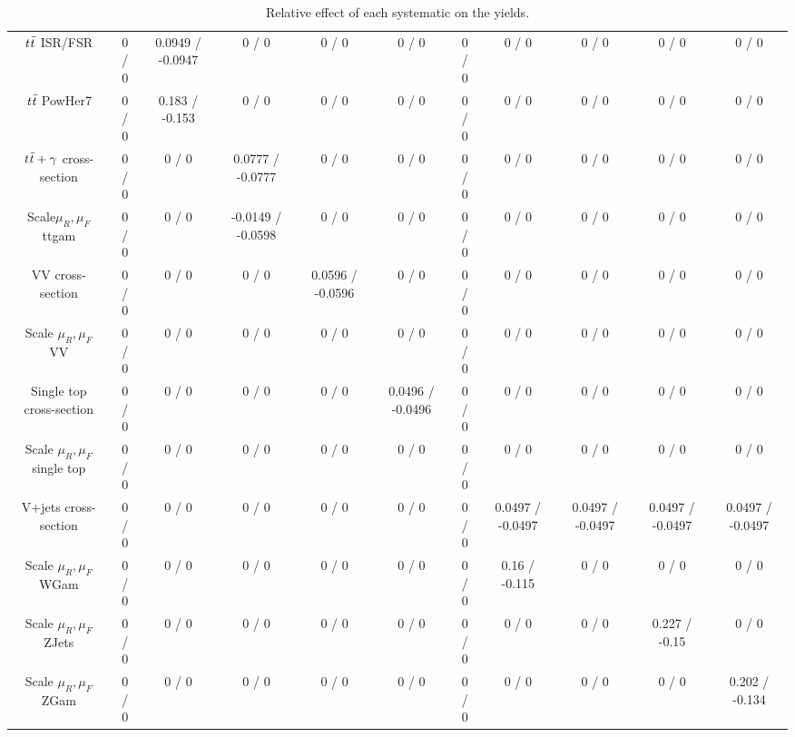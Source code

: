 \begin{table}[htbp]
\begin{center}
\begin{tabular}{|c|c|c|c|c|c|c|c|c|c|c|}
$  \it{t\bar{t}}$ ISR/FSR & 0 / 0 & 0.0949 / -0.0947 & 0 / 0 & 0 / 0 & 0 / 0 & 0 / 0 & 0 / 0 & 0 / 0 & 0 / 0 & 0 / 0 \\ 
 $ \it{t\bar{t}} $ PowHer7 & 0 / 0 & 0.183 / -0.153 & 0 / 0 & 0 / 0 & 0 / 0 & 0 / 0 & 0 / 0 & 0 / 0 & 0 / 0 & 0 / 0 \\ 
  $\it{t\bar{t}}+\gamma $ cross-section & 0 / 0 & 0 / 0 & 0.0777 / -0.0777 & 0 / 0 & 0 / 0 & 0 / 0 & 0 / 0 & 0 / 0 & 0 / 0 & 0 / 0 \\ 
  Scale$ \mu_{R},\mu_{F}$ ttgam & 0 / 0 & 0 / 0 & -0.0149 / -0.0598 & 0 / 0 & 0 / 0 & 0 / 0 & 0 / 0 & 0 / 0 & 0 / 0 & 0 / 0 \\ 
  VV cross-section & 0 / 0 & 0 / 0 & 0 / 0 & 0.0596 / -0.0596 & 0 / 0 & 0 / 0 & 0 / 0 & 0 / 0 & 0 / 0 & 0 / 0 \\ 
  Scale $\mu_{R},\mu_{F}$ VV & 0 / 0 & 0 / 0 & 0 / 0 & 0 / 0 & 0 / 0 & 0 / 0 & 0 / 0 & 0 / 0 & 0 / 0 & 0 / 0 \\ 
  Single top cross-section & 0 / 0 & 0 / 0 & 0 / 0 & 0 / 0 & 0.0496 / -0.0496 & 0 / 0 & 0 / 0 & 0 / 0 & 0 / 0 & 0 / 0 \\ 
  Scale $\mu_{R},\mu_{F}$ single top & 0 / 0 & 0 / 0 & 0 / 0 & 0 / 0 & 0 / 0 & 0 / 0 & 0 / 0 & 0 / 0 & 0 / 0 & 0 / 0 \\ 
  V+jets cross-section & 0 / 0 & 0 / 0 & 0 / 0 & 0 / 0 & 0 / 0 & 0 / 0 & 0.0497 / -0.0497 & 0.0497 / -0.0497 & 0.0497 / -0.0497 & 0.0497 / -0.0497 \\ 
  Scale $\mu_{R},\mu_{F}$ WGam & 0 / 0 & 0 / 0 & 0 / 0 & 0 / 0 & 0 / 0 & 0 / 0 & 0.16 / -0.115 & 0 / 0 & 0 / 0 & 0 / 0 \\ 
  Scale $\mu_{R},\mu_{F}$ ZJets & 0 / 0 & 0 / 0 & 0 / 0 & 0 / 0 & 0 / 0 & 0 / 0 & 0 / 0 & 0 / 0 & 0.227 / -0.15 & 0 / 0 \\ 
  Scale $\mu_{R},\mu_{F}$ ZGam & 0 / 0 & 0 / 0 & 0 / 0 & 0 / 0 & 0 / 0 & 0 / 0 & 0 / 0 & 0 / 0 & 0 / 0 & 0.202 / -0.134 \\ 
\hline 
\end{tabular} 
\caption{Relative effect of each systematic on the yields.} 
\end{center} 
\end{table} 
